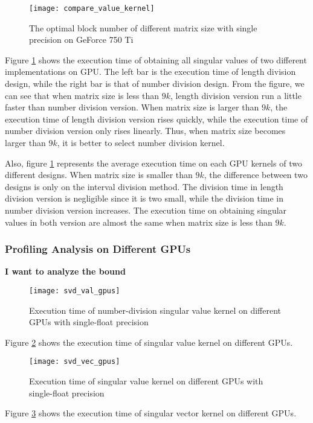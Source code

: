 \begin{figure}[hbpt]
\centering
\texttt{[image: compare\_value\_kernel]}
\caption{The optimal block number of different matrix size with single precision on GeForce 750 Ti}
\label{fig:compare_value_kernel}
\end{figure}
Figure \ref{fig:compare_value_kernel} shows the execution time of obtaining all singular values of two different implementations on GPU.
The left bar is the execution time of length division design, while the right bar is that of number division design.
From the figure, we can see that when matrix size is less than $9k$, length division version run a little faster than number division version.
When matrix size is larger than $9k$, the execution time of length division version rises quickly, while the execution time of number division version only rises linearly.
Thus, when matrix size becomes larger than $9k$, it is better to select number division kernel.

Also, figure \ref{fig:compare_value_kernel} represents the average execution time on each GPU kernels of two different designs.
When matrix size is smaller than $9k$, the difference between two designs is only on the interval division method.
The division time in length division version is negligible since it is two small, while the division time in number division version increases.
The execution time on obtaining singular values in both version are almost the same when matrix size is less than $9k$.

\subsubsection{Profiling Analysis on Different GPUs}
\textbf{I want to analyze the bound}

\begin{figure}[hbpt]
\centering
\texttt{[image: svd\_val\_gpus]}
\caption{Execution time of number-division singular value kernel on different GPUs with single-float precision}
\label{fig:svd_val}
\end{figure}
Figure \ref{fig:svd_val} shows the execution time of singular value kernel on different GPUs. 

\begin{figure}[hbpt]
\centering
\texttt{[image: svd\_vec\_gpus]}
\caption{Execution time of singular value kernel on different GPUs with single-float precision}
\label{fig:svd_vec}
\end{figure}
Figure \ref{fig:svd_vec} shows the execution time of singular vector kernel on different GPUs. 

